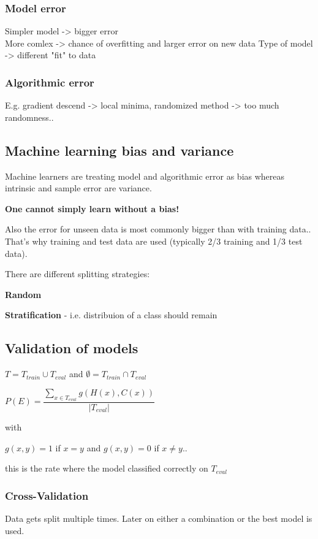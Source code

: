 \documentclass[fleqn, oneside, 10pt, titlepage]{article}
\begin{document}
\subsubsection{Model error}
Simpler model -> bigger error\\
More comlex -> chance of overfitting and larger error on new data
Type of model -> different "fit" to data

\subsubsection{Algorithmic error}
E.g. gradient descend -> local minima, randomized method -> too much randomness..

\subsection{Machine learning bias and variance}
Machine learners are treating model and algorithmic error as bias whereas intrinsic and sample error are variance.

\textbf{One cannot simply learn without a bias!}

Also the error for unseen data is most commonly bigger than with training data.. That's why training and test data are used (typically 2/3 training and 1/3 test data).

There are different splitting strategies:

\textbf{Random}

\textbf{Stratification} - i.e. distribuion of a class should remain

\subsection{Validation of models}
$T = T_{train} \cup T_{eval}$ and
$\emptyset = T_{train} \cap T_{eval}$

$P(E) = \dfrac{\sum_{x \in T_{eval}} g(H(x), C(x))}{|T_{eval}|}$

with

$g(x,y) = 1$ if $x = y$ and $g(x,y) = 0$ if $x \neq y$..

this is the rate where the model classified correctly on $T_{eval}$

\subsubsection{Cross-Validation}
Data gets split multiple times. Later on either a combination or the best model is used.
\end{document}
